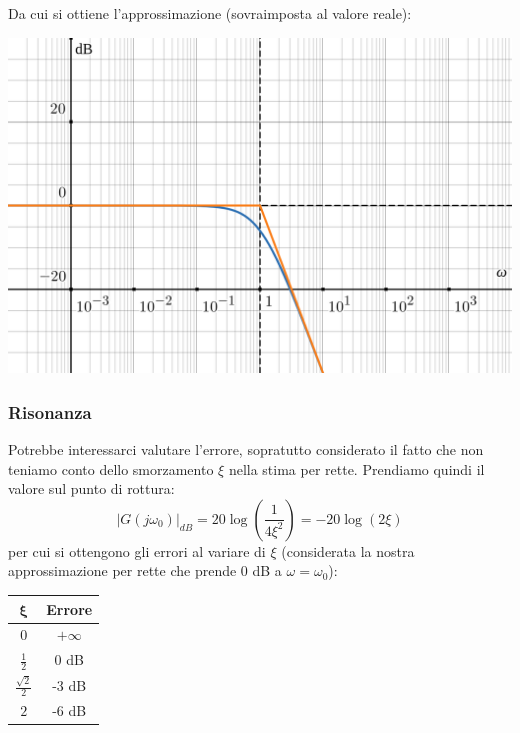 \documentclass[a4paper,11pt]{article}
\begin{document}
\par\bigskip

\noindent
\begin{minipage}{\textwidth}
Da cui si ottiene l'approssimazione (sovraimposta al valore reale):
\begin{center}
	\includegraphics[scale=0.3]{../figures/order2_bode/clean_mod.png}
\end{center}
\end{minipage}

\par\bigskip

\subsubsection{Risonanza}
Potrebbe interessarci valutare l'errore, sopratutto considerato il fatto che non teniamo conto dello smorzamento $\xi$ nella stima per rette.
Prendiamo quindi il valore sul punto di rottura:
$$
|G(j\omega_0)|_{dB} = 20 \log \left( \frac{1}{4 \xi^2} \right) = -20 \log\left( 2 \xi \right) 
$$
per cui si ottengono gli errori al variare di $\xi$ (considerata la nostra approssimazione per rette che prende 0 dB a $\omega = \omega_0$):
\begin{table}[h!]
	\center {}
	\begin{tabular} { c | c }
		$\mathbf{\xi}$ & \bfseries Errore \\ 
		\hline
		$0$ & $+\infty$ \\
		$\frac{1}{2}$ & 0 dB \\
		$\frac{\sqrt{2}}{2}$ & -3 dB \\
		$2$ & -6 dB \\
	\end{tabular}
\end{table}
\end{document}
